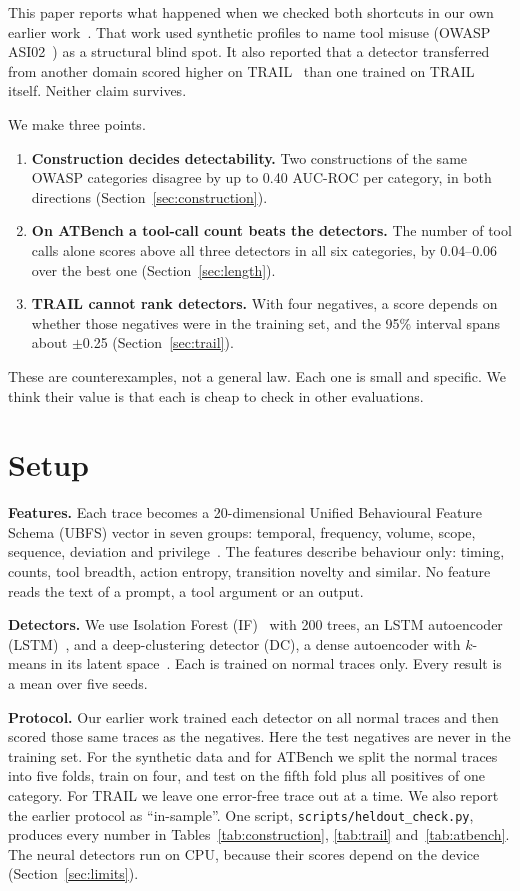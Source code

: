 \documentclass[conference]{IEEEtran}
\begin{document}
This paper reports what happened when we checked both shortcuts in our own earlier work~\cite{rimal2026ssrn}. That work used synthetic profiles to name tool misuse (OWASP ASI02~\cite{owasp2024asi}) as a structural blind spot. It also reported that a detector transferred from another domain scored higher on TRAIL~\cite{patronus2024trail} than one trained on TRAIL itself. Neither claim survives.

We make three points.
\begin{enumerate}
\item \textbf{Construction decides detectability.} Two constructions of the same OWASP categories disagree by up to 0.40 AUC-ROC per category, in both directions (Section~\ref{sec:construction}).
\item \textbf{On ATBench a tool-call count beats the detectors.} The number of tool calls alone scores above all three detectors in all six categories, by 0.04--0.06 over the best one (Section~\ref{sec:length}).
\item \textbf{TRAIL cannot rank detectors.} With four negatives, a score depends on whether those negatives were in the training set, and the 95\% interval spans about $\pm$0.25 (Section~\ref{sec:trail}).
\end{enumerate}

These are counterexamples, not a general law. Each one is small and specific. We think their value is that each is cheap to check in other evaluations.

\section{Setup}
\label{sec:setup}

\textbf{Features.} Each trace becomes a 20-dimensional Unified Behavioural Feature Schema (UBFS) vector in seven groups: temporal, frequency, volume, scope, sequence, deviation and privilege~\cite{rimal2026ssrn}. The features describe behaviour only: timing, counts, tool breadth, action entropy, transition novelty and similar. No feature reads the text of a prompt, a tool argument or an output.

\textbf{Detectors.} We use Isolation Forest (IF)~\cite{liu2008isolation} with 200 trees, an LSTM autoencoder (LSTM)~\cite{malhotra2016lstm}, and a deep-clustering detector (DC), a dense autoencoder with $k$-means in its latent space~\cite{xie2024deep}. Each is trained on normal traces only. Every result is a mean over five seeds.

\textbf{Protocol.} Our earlier work trained each detector on all normal traces and then scored those same traces as the negatives. Here the test negatives are never in the training set. For the synthetic data and for ATBench we split the normal traces into five folds, train on four, and test on the fifth fold plus all positives of one category. For TRAIL we leave one error-free trace out at a time. We also report the earlier protocol as ``in-sample''. One script, \texttt{scripts/heldout\_check.py}, produces every number in Tables~\ref{tab:construction}, \ref{tab:trail} and~\ref{tab:atbench}. The neural detectors run on CPU, because their scores depend on the device (Section~\ref{sec:limits}).
\end{document}
